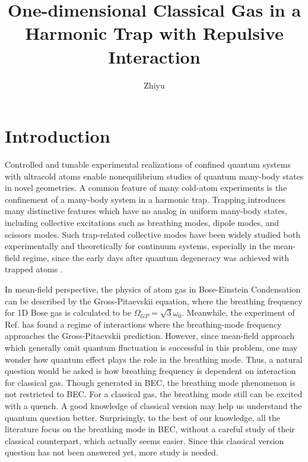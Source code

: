 \documentclass[aps,pre,twocolumn,groupedaddress]{revtex4-1}
\begin{document}
 \title{One-dimensional Classical Gas in a Harmonic Trap with Repulsive Interaction}
 \author{Zhiyu}
 
 
\begin{abstract}
\end{abstract}
 \maketitle
\section{Introduction}
Controlled and tunable experimental realizations of confined quantum systems with ultracold atoms enable nonequilibrium studies of quantum many-body states in novel geometries. A common feature of many cold-atom experiments is the confinement of a many-body system in a harmonic trap. Trapping introduces many distinctive features which have no analog in uniform many-body states, including collective excitations such as breathing modes, dipole modes, and scissors modes. Such trap-related collective modes have been widely studied both experimentally and theoretically for continuum systems, especially in the mean-field regime, since the early days after quantum degeneracy was achieved with trapped atoms \cite{Dalfovo1997}\cite{Jin1996}.

In mean-field perspective, the physics of atom gas in Bose-Einstein Condensation can be described by the Gross-Pitaevskii equation\cite{Dalfovo1999}\cite{Stringari1996}, where the breathing frequency for 1D Bose gas is calculated to be $\Omega_{GP}=\sqrt{3}\omega_0$. Meanwhile, the experiment of Ref.\cite{Haller2009} has found a regime of interactions where the breathing-mode frequency approaches the Gross-Pitaevskii prediction. However, since mean-field approach which generally omit quantum fluctuation is successful in this problem, one may wonder how quantum effect plays the role in the breathing mode. Thus, a natural question would be asked is how breathing frequency is dependent on interaction for classical gas. Though generated in BEC, the breathing mode phenomenon is not restricted to BEC. For a classical gas, the breathing mode still can be excited with a quench. A good knowledge of classical version may help us understand the quantum question better. Surprisingly, to the best of our knowledge, all the literature focus on the breathing mode in BEC, without a careful study of their classical counterpart, which actually seems easier. Since this classical version question has not been answered yet, more study is needed.
\end{document}
